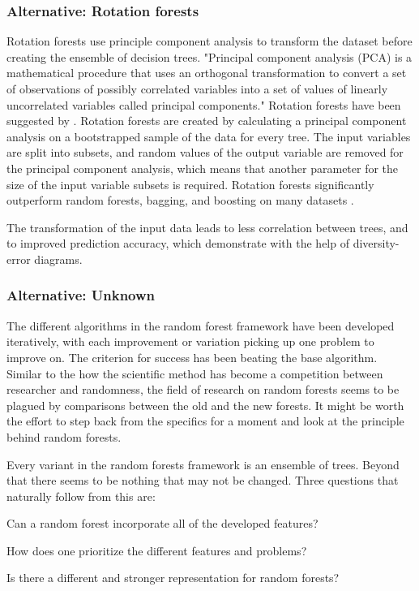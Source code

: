 \documentclass[a4paper,man,12pt,apacite,floatsintext,draftfirst]{apa6} %
\begin{document}
\subsubsection{Alternative: Rotation forests}
Rotation forests use principle component analysis to transform
the dataset before creating the ensemble of decision trees.
"Principal component analysis (PCA) is a mathematical procedure that uses
an orthogonal transformation to convert a set of observations of possibly
correlated variables into a set of values of linearly uncorrelated variables
called principal components." \cite{wpPCA}
Rotation forests have been suggested by \cite{rodriguez2006rotation}.
Rotation forests are created by calculating a principal component analysis
on a bootstrapped sample of the data for every tree.
The input variables are split into subsets, and random values of the output
variable are removed for the principal component analysis, which means that
another parameter for the size of the input variable subsets is required.
Rotation forests significantly outperform random forests, bagging, and
boosting on many datasets \cite{rodriguez2006rotation}.

The transformation of the input data leads to less correlation between trees,
and to improved prediction accuracy, which \cite{rodriguez2006rotation}
demonstrate with the help of diversity-error diagrams.

\subsubsection{Alternative: Unknown}
The different algorithms in the random forest framework have been developed
iteratively, with each improvement or variation picking up one problem to
improve on.
The criterion for success has been beating the base algorithm.
Similar to the how the scientific method has become a competition between
researcher and randomness, the field of research on random forests seems
to be plagued by comparisons between the old and the new forests.
It might be worth the effort to step back from the specifics for a moment
and look at the principle behind random forests.

Every variant in the random forests framework is an ensemble of trees.
Beyond that there seems to be nothing that may not be changed.
Three questions that naturally follow from this are:

\begin{APAenumerate}
\item Can a random forest incorporate all of the developed features?
\item How does one prioritize the different features and problems?
\item Is there a different and stronger representation for random forests?
\end{APAenumerate}
\end{document}
